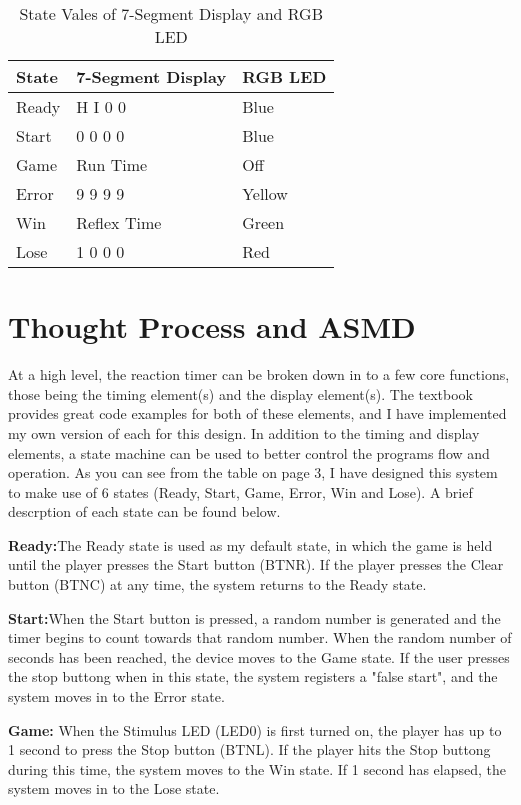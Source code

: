 \documentclass{article}
\begin{document}
\begin{table}[h!]
	\begin{center}
		\caption{State Vales of 7-Segment Display and RGB LED}
		\label{table:table1}
		\begin{tabular}{l l l}
			\textbf{State} & \textbf{7-Segment Display} & \textbf{RGB LED}\\
			\hline
			Ready & H I 0 0 & Blue\\
			Start & 0 0 0 0 & Blue\\
			Game & Run Time & Off\\
			Error & 9 9 9 9 & Yellow\\
			Win & Reflex Time & Green\\
			Lose & 1 0 0 0 & Red
		\end{tabular}
	\end{center}
\end{table}
\newpage

\section{Thought Process and ASMD}
At a high level, the reaction timer can be broken down in to a few core functions, those being the timing element(s) and the display element(s). The textbook provides great code examples for both of these elements, and I have implemented my own version of each for this design. In addition to the timing and display elements, a state machine can be used to better control the programs flow and operation. As you can see from the table on page 3, I have designed this system to make use of 6 states (Ready, Start, Game, Error, Win and Lose). A brief descrption of each state can be found below.

\medskip
\textbf{Ready:}The Ready state is used as my default state, in which the game is held until the player presses the Start button (BTNR). If the player presses the Clear button (BTNC) at any time, the system returns to the Ready state.

\smallskip
\textbf{Start:}When the Start button is pressed, a random number is generated and the timer begins to count towards that random number. When the random number of seconds has been reached, the device moves to the Game state. If the user presses the stop buttong when in this state, the system registers a "false start", and the system moves in to the Error state.

\smallskip
\textbf{Game: }When the Stimulus LED (LED0) is first turned on, the player has up to 1 second to press the Stop button (BTNL). If the player hits the Stop buttong during this time, the system moves to the Win state. If 1 second has elapsed, the system moves in to the Lose state.
\end{document}
